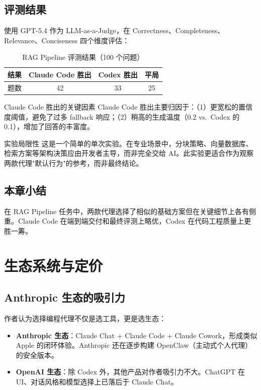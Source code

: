\documentclass[a4paper]{article}
\begin{document}
\subsection{评测结果}

使用 GPT-5.4 作为 LLM-as-a-Judge，在 Correctness、Completeness、Relevance、Conciseness 四个维度评估：

\begin{table}[H]
\centering
\caption{RAG Pipeline 评测结果（100 个问题）}
\begin{tabular}{lccc}
\toprule
\textbf{结果} & \textbf{Claude Code 胜出} & \textbf{Codex 胜出} & \textbf{平局} \\
\midrule
题数 & 42 & 33 & 25 \\
\bottomrule
\end{tabular}
\end{table}

\begin{importantbox}{Claude Code 胜出的关键因素}
Claude Code 胜出主要归因于：（1）更宽松的置信度阈值，避免了过多 fallback 响应；（2）稍高的生成温度（0.2 vs.\ Codex 的 0.1），增加了回答的丰富度。
\end{importantbox}

\begin{warningbox}{实验局限性}
这是一个简单的单次实验。在专业场景中，分块策略、向量数据库、检索方案等架构决策应由开发者主导，而非完全交给 AI。此实验更适合作为观察两款代理"默认行为"的参考，而非最终结论。
\end{warningbox}

\subsection{本章小结}

在 RAG Pipeline 任务中，两款代理选择了相似的基础方案但在关键细节上各有侧重。Claude Code 在端到端交付和最终评测上略优，Codex 在代码工程质量上更胜一筹。

\section{生态系统与定价}

\subsection{Anthropic 生态的吸引力}

作者认为选择编程代理不仅是选工具，更是选生态：

\begin{itemize}
    \item \textbf{Anthropic 生态}：Claude Chat + Claude Code + Claude Cowork，形成类似 Apple 的闭环体验。Anthropic 还在逐步构建 OpenClaw（主动式个人代理）的安全版本。
    \item \textbf{OpenAI 生态}：除 Codex 外，其他产品对作者吸引力不大。ChatGPT 在 UI、对话风格和模型选择上已落后于 Claude Chat。
\end{itemize}
\end{document}
